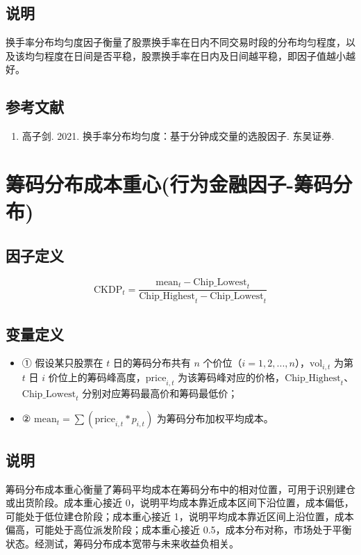 \documentclass{article}
\begin{document}
\subsection{说明}
换手率分布均匀度因子衡量了股票换手率在日内不同交易时段的分布均匀程度，以及该均匀程度在日间是否平稳，股票换手率在日内及日间越平稳，即因子值越小越好。

\subsection{参考文献}
\begin{enumerate}
    \item 高子剑. 2021. 换手率分布均匀度：基于分钟成交量的选股因子. 东吴证券.
\end{enumerate}

\section{筹码分布成本重心(行为金融因子-筹码分布)}

\subsection{因子定义}

\begin{equation}
    \mathrm{CKDP}_t = \frac{\mathrm{mean}_t - \mathrm{Chip\_Lowest}_t}{\mathrm{Chip\_Highest}_t - \mathrm{Chip\_Lowest}_t}
\end{equation}

\subsection{变量定义}
\begin{itemize}
    \item ① 假设某只股票在 \( t \) 日的筹码分布共有 \( n \) 个价位（\( i = 1, 2, ..., n \)），\( \mathrm{vol}_{i,t} \) 为第 \( t \) 日 \( i \) 价位上的筹码峰高度，\( \mathrm{price}_{i,t} \) 为该筹码峰对应的价格，\( \mathrm{Chip\_Highest}_t \)、\( \mathrm{Chip\_Lowest}_t \) 分别对应筹码最高价和筹码最低价；
    \item ② \(\displaystyle \mathrm{mean}_t = \sum (\mathrm{price}_{i,t} * p_{i,t})\) 为筹码分布加权平均成本。
\end{itemize}

\subsection{说明}
筹码分布成本重心衡量了筹码平均成本在筹码分布中的相对位置，可用于识别建仓或出货阶段。成本重心接近 0，说明平均成本靠近成本区间下沿位置，成本偏低，可能处于低位建仓阶段；成本重心接近 1，说明平均成本靠近区间上沿位置，成本偏高，可能处于高位派发阶段；成本重心接近 0.5，成本分布对称，市场处于平衡状态。经测试，筹码分布成本宽带与未来收益负相关。
\end{document}
